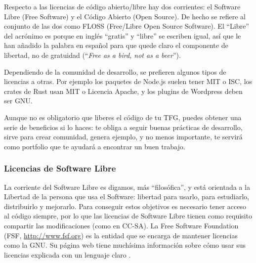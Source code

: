 Respecto a las licencias de código abierto/libre hay dos corrientes: el Software Libre (Free Software) y el Código Abierto (Open Source). De hecho se refiere al conjunto de las dos como FLOSS (Free/Libre Open Source Software). El ``Libre'' del acrónimo es porque en inglés ``gratis'' y ``libre'' se escriben igual, así que le han añadido la palabra en español para que quede claro el componente de libertad, no de gratuidad (``\textit{Free as a bird, not as a beer}'').

Dependiendo de la comunidad de desarrollo, se prefieren algunos tipos de licencias a otras. Por ejemplo los paquetes de Node.js suelen tener MIT o ISC, los crates de Rust usan MIT o Licencia Apache, y los plugins de Wordpress deben ser GNU.

Aunque no es obligatorio que liberes el código de tu TFG, puedes obtener una serie de beneficios si lo haces: te obliga a seguir buenas prácticas de desarrollo, sirve para crear comunidad, genera ejemplo, y no menos importante, te servirá como portfolio que te ayudará a encontrar un buen trabajo.

\subsubsection{Licencias de Software Libre}
La corriente del Software Libre es digamos, más ``filosófica'', y está orientada a la Libertad de la persona que usa el Software: libertad para usarlo, para estudiarlo, distribuirlo y mejorarlo. Para conseguir estos objetivos es necesario tener acceso al código siempre, por lo que las licencias de Software Libre tienen como requisito compartir las modificaciones (como en CC-SA). La Free Software Foundation (FSF, \url{http://www.fsf.org}) es la entidad que se encarga de mantener licencias como la GNU. Su página web tiene muchísima información sobre cómo usar sus licencias explicada con un lenguaje claro \cite{FSFfaq}.

